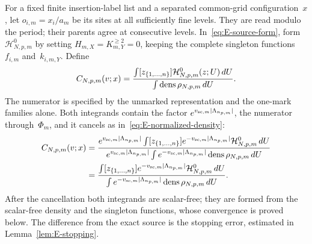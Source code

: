 For a fixed finite insertion-label list and a separated common-grid configuration~$x$, let $o_{i,m}=x_i/a_m$ be its sites at all sufficiently fine levels. They are read modulo the period; their parents agree at consecutive levels. In~\eqref{eq:E-source-form}, form $\mathcal H^0_{N,p,m}$ by setting $H_{m,X}=K^{\ge2}_{m,Y}=0$, keeping the complete singleton functions $f_{i,m}$ and~$k_{i,m,Y}$. Define
\begin{equation}\label{eq:E-coarse-integral}
 C_{N,p,m}(v;x)=
 \frac{\int[z_{\{1,\ldots,n\}}]\mathcal H^0_{N,p,m}(z;U)\,dU}
      {\int\operatorname{dens}\rho_{N,p,m}\,dU}.
\end{equation}
The numerator is specified by the unmarked representation and the one-mark families alone. Both integrands contain the factor $e^{v_{{\rm sc},m}|\Lambda_{n_{p,m}}|}$, the numerator through~$\Phi_m$, and it cancels as in~\eqref{eq:E-normalized-density}:
\begin{equation}\label{eq:E-coarse-scalar-free}
\begin{aligned}
 C_{N,p,m}(v;x)&=
 \frac{e^{v_{{\rm sc},m}|\Lambda_{n_{p,m}}|}\int[z_{\{1,\ldots,n\}}]e^{-v_{{\rm sc},m}|\Lambda_{n_{p,m}}|}\mathcal H^0_{N,p,m}\,dU}
      {e^{v_{{\rm sc},m}|\Lambda_{n_{p,m}}|}\int e^{-v_{{\rm sc},m}|\Lambda_{n_{p,m}}|}\operatorname{dens}\rho_{N,p,m}\,dU}
 \\
 &=\frac{\int[z_{\{1,\ldots,n\}}]e^{-v_{{\rm sc},m}|\Lambda_{n_{p,m}}|}\mathcal H^0_{N,p,m}\,dU}
      {\int e^{-v_{{\rm sc},m}|\Lambda_{n_{p,m}}|}\operatorname{dens}\rho_{N,p,m}\,dU}.
\end{aligned}
\end{equation}
After the cancellation both integrands are scalar-free; they are formed from the scalar-free density and the singleton functions, whose convergence is proved below. The difference from the exact source is the stopping error, estimated in Lemma~\ref{lem:E-stopping}.

